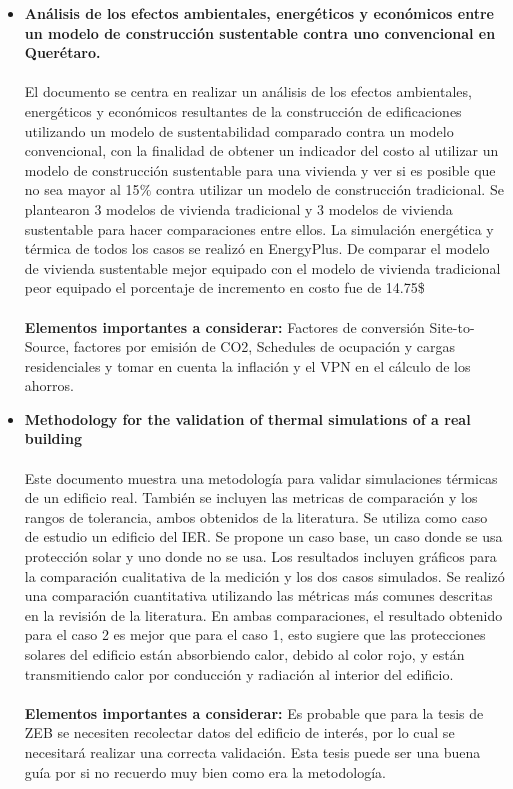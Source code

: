 \documentclass[10pt,twoside]{tesisIER}
\begin{document}
\begin{itemize}
\item \textbf{Análisis de los efectos ambientales, energéticos y económicos entre un modelo de construcción sustentable contra uno convencional en Querétaro.}
\\\\
El documento se centra en realizar un análisis de los efectos ambientales, energéticos y económicos resultantes de la construcción de edificaciones utilizando un modelo de sustentabilidad comparado contra un modelo convencional, con la finalidad de obtener un indicador del costo al utilizar un modelo de construcción sustentable para una vivienda y ver si es posible que no sea mayor al 15$\%$ contra  utilizar un modelo de construcción tradicional. Se plantearon 3 modelos de vivienda tradicional y 3 modelos de vivienda sustentable para hacer comparaciones entre ellos. La simulación energética y térmica de todos los casos se realizó en EnergyPlus. De comparar el modelo de vivienda sustentable mejor equipado con el modelo de vivienda tradicional peor equipado el porcentaje de incremento en costo fue de 14.75\$%
\\\\
\textbf{Elementos importantes a considerar:} Factores de conversión Site-to-Source, factores por emisión de CO2, Schedules de ocupación y cargas residenciales y tomar en cuenta la inflación y el VPN en el cálculo de los ahorros.


\item \textbf{Methodology for the validation of thermal simulations of a real building}
\\\\
Este documento muestra una metodología para validar simulaciones térmicas de un edificio real. También se incluyen las metricas de comparación y los rangos de tolerancia, ambos obtenidos de la literatura. Se utiliza como caso de estudio un edificio del IER. Se propone un caso base, un caso donde se usa protección solar y uno donde no se usa. Los resultados incluyen gráficos para la comparación cualitativa de la medición y los dos casos simulados. Se realizó una comparación cuantitativa utilizando las métricas más comunes descritas en la revisión de la literatura. En ambas comparaciones, el resultado obtenido para el caso 2 es mejor que para el caso 1, esto sugiere que las protecciones solares del edificio están absorbiendo calor, debido al color rojo, y están transmitiendo calor por conducción y radiación al interior del edificio.
\\\\
\textbf{Elementos importantes a considerar:} Es probable que para la tesis de ZEB se necesiten recolectar datos del edificio de interés, por lo cual se necesitará realizar una correcta validación. Esta tesis puede ser una buena guía por si no recuerdo muy bien como era la metodología. 


\end{itemize}
\end{document}
